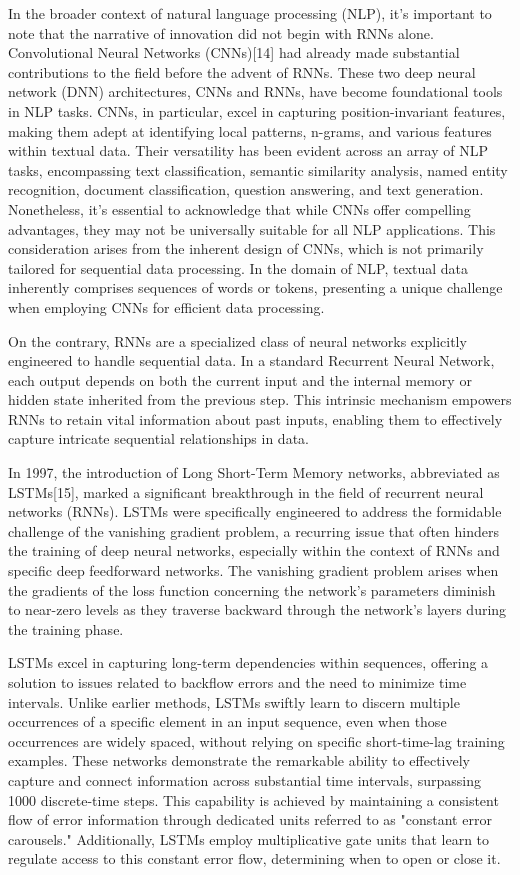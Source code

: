 \documentclass[conference]{IEEEtran}
\begin{document}
In the broader context of natural language processing (NLP), it's important to note that the narrative of innovation did not begin with RNNs alone. Convolutional Neural Networks (CNNs)[14] had already made substantial contributions to the field before the advent of RNNs. These two deep neural network (DNN) architectures, CNNs and RNNs, have become foundational tools in NLP tasks. CNNs, in particular, excel in capturing position-invariant features, making them adept at identifying local patterns, n-grams, and various features within textual data. Their versatility has been evident across an array of NLP tasks, encompassing text classification, semantic similarity analysis, named entity recognition, document classification, question answering, and text generation. Nonetheless, it's essential to acknowledge that while CNNs offer compelling advantages, they may not be universally suitable for all NLP applications. This consideration arises from the inherent design of CNNs, which is not primarily tailored for sequential data processing. In the domain of NLP, textual data inherently comprises sequences of words or tokens, presenting a unique challenge when employing CNNs for efficient data processing.


On the contrary, RNNs are a specialized class of neural networks explicitly engineered to handle sequential data. In a standard Recurrent Neural Network, each output depends on both the current input and the internal memory or hidden state inherited from the previous step. This intrinsic mechanism empowers RNNs to retain vital information about past inputs, enabling them to effectively capture intricate sequential relationships in data. 




In 1997, the introduction of Long Short-Term Memory networks, abbreviated as LSTMs[15], marked a significant breakthrough in the field of recurrent neural networks (RNNs). LSTMs were specifically engineered to address the formidable challenge of the vanishing gradient problem, a recurring issue that often hinders the training of deep neural networks, especially within the context of RNNs and specific deep feedforward networks. The vanishing gradient problem arises when the gradients of the loss function concerning the network's parameters diminish to near-zero levels as they traverse backward through the network's layers during the training phase.


LSTMs excel in capturing long-term dependencies within sequences, offering a solution to issues related to backflow errors and the need to minimize time intervals. Unlike earlier methods, LSTMs swiftly learn to discern multiple occurrences of a specific element in an input sequence, even when those occurrences are widely spaced, without relying on specific short-time-lag training examples. These networks demonstrate the remarkable ability to effectively capture and connect information across substantial time intervals, surpassing 1000 discrete-time steps. This capability is achieved by maintaining a consistent flow of error information through dedicated units referred to as "constant error carousels." Additionally, LSTMs employ multiplicative gate units that learn to regulate access to this constant error flow, determining when to open or close it.
\end{document}
